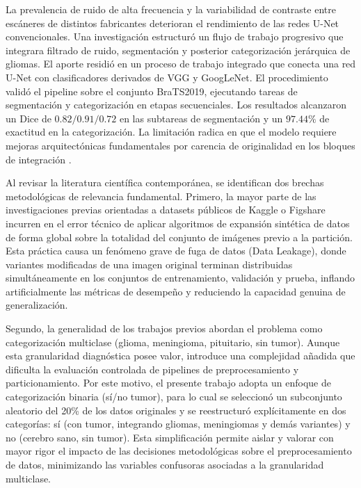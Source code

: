 La prevalencia de ruido de alta frecuencia y la variabilidad de contraste entre escáneres de distintos fabricantes deterioran el rendimiento de las redes U-Net convencionales. Una investigación estructuró un flujo de trabajo progresivo que integrara filtrado de ruido, segmentación y posterior categorización jerárquica de gliomas. El aporte residió en un proceso de trabajo integrado que conecta una red U-Net con clasificadores derivados de VGG y GoogLeNet. El procedimiento validó el pipeline sobre el conjunto BraTS2019, ejecutando tareas de segmentación y categorización en etapas secuenciales. Los resultados alcanzaron un Dice de $0.82 / 0.91 / 0.72$ en las subtareas de segmentación y un $97.44\%$ de exactitud en la categorización. La limitación radica en que el modelo requiere mejoras arquitectónicas fundamentales por carencia de originalidad en los bloques de integración \cite{Dang2022}.

Al revisar la literatura científica contemporánea, se identifican dos brechas metodológicas de relevancia fundamental. Primero, la mayor parte de las investigaciones previas orientadas a datasets públicos de Kaggle o Figshare \cite{Disci2025, BabuVimala2023, DwiPrayogo2025, Mitra2025, Panigrahi2025, Jain2025} incurren en el error técnico de aplicar algoritmos de expansión sintética de datos de forma global sobre la totalidad del conjunto de imágenes previo a la partición. Esta práctica causa un fenómeno grave de fuga de datos (Data Leakage), donde variantes modificadas de una imagen original terminan distribuidas simultáneamente en los conjuntos de entrenamiento, validación y prueba, inflando artificialmente las métricas de desempeño y reduciendo la capacidad genuina de generalización.

Segundo, la generalidad de los trabajos previos abordan el problema como categorización multiclase (glioma, meningioma, pituitario, sin tumor). Aunque esta granularidad diagnóstica posee valor, introduce una complejidad añadida que dificulta la evaluación controlada de pipelines de preprocesamiento y particionamiento. Por este motivo, el presente trabajo adopta un enfoque de categorización binaria (sí/no tumor), para lo cual se seleccionó un subconjunto aleatorio del 20\% de los datos originales y se reestructuró explícitamente en dos categorías: sí (con tumor, integrando gliomas, meningiomas y demás variantes) y no (cerebro sano, sin tumor). Esta simplificación permite aislar y valorar con mayor rigor el impacto de las decisiones metodológicas sobre el preprocesamiento de datos, minimizando las variables confusoras asociadas a la granularidad multiclase.

